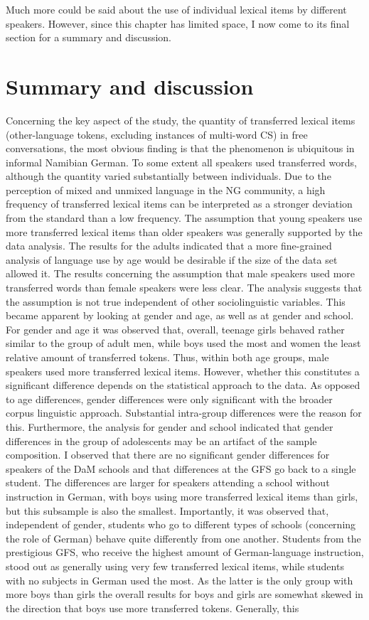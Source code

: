 \documentclass[output=paper]{langsci/langscibook}
\begin{document}
Much more could be said about the use of individual lexical items by different speakers. However, since this chapter has limited space, I now come to its final section for a summary and discussion.

 
\section{Summary and discussion}
\label{sec:bracke:6}
 

Concerning the key aspect of the study, the quantity of transferred lexical items (other-language tokens, excluding instances of multi-word CS) in free conversations, the most obvious finding is that the phenomenon is ubiquitous in informal Namibian German. To some extent all speakers used transferred words, although the quantity varied substantially between individuals. Due to the perception of mixed and unmixed language in the NG community, a high frequency of transferred lexical items can be interpreted as a stronger deviation from the standard than a low frequency. The assumption that young speakers use more transferred lexical items than older speakers was generally supported by the data analysis. The results for the adults indicated that a more fine-grained analysis of language use by age would be desirable if the size of the data set allowed it. The results concerning the assumption that male speakers used more transferred words than female speakers were less clear. The analysis suggests that the assumption is not true independent of other sociolinguistic variables. This became apparent by looking at gender and age, as well as at gender and school. For gender and age it was observed that, overall, teenage girls behaved rather similar to the group of adult men, while boys used the most and women the least relative amount of transferred tokens. Thus, within both age groups, male speakers used more transferred lexical items. However, whether this constitutes a significant difference depends on the statistical approach to the data. As opposed to age differences, gender differences were only significant with the broader corpus linguistic approach. Substantial intra-group differences were the reason for this. Furthermore, the analysis for gender and school indicated that gender differences in the group of adolescents may be an artifact of the sample composition. I observed that there are no significant gender differences for speakers of the DaM schools and that differences at the GFS go back to a single student. The differences are larger for speakers attending a school without instruction in German, with boys using more transferred lexical items than girls, but this subsample is also the smallest. Importantly, it was observed that, independent of gender, students who go to different types of schools (concerning the role of German) behave quite differently from one another. Students from the prestigious GFS, who receive the highest amount of German-language instruction, stood out as generally using very few transferred lexical items, while students with no subjects in German used the most. As the latter is the only group with more boys than girls the overall results for boys and girls are somewhat skewed in the direction that boys use more transferred tokens. Generally, this 
\end{document}
